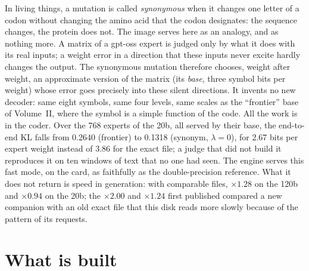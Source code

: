 \begin{enbref}
In living things, a mutation is called \emph{synonymous} when it changes one letter of a codon without changing the amino acid that the codon designates: the sequence changes, the protein does not. The image serves here as an analogy, and as nothing more. A matrix of a gpt-oss expert is judged only by what it does with its real inputs; a weight error in a direction that these inputs never excite hardly changes the output. The synonymous mutation therefore chooses, weight after weight, an approximate version of the matrix (its \emph{base}, three symbol bits per weight) whose error goes precisely into these silent directions. It invents no new decoder: same eight symbols, same four levels, same scales as the ``frontier'' base of Volume~II, where the symbol is a simple function of the code. All the work is in the coder. Over the \num{768} experts of the 20b, all served by their base, the end-to-end KL falls from \num{0.2640} (frontier) to \num{0.1318} (synonym, $\lambda = 0$), for \num{2.67} bits per expert weight instead of \num{3.86} for the exact file; a judge that did not build it reproduces it on ten windows of text that no one had seen. The engine serves this fast mode, on the card, as faithfully as the double-precision reference. What it does not return is speed in generation: with comparable files, $\times 1.28$ on the 120b and $\times 0.94$ on the 20b; the $\times 2.00$ and $\times 1.24$ first published compared a new companion with an old exact file that this disk reads more slowly because of the pattern of its requests.
\end{enbref}

\section{What is built}\label{t3sno:sec:construit}

